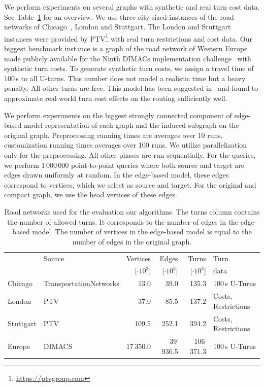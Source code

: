\documentclass[a4paper, english, cleveref]{lipics-v2021}
\begin{document}
We perform experiments on several graphs with synthetic and real turn cost data.
See Table~\ref{tab:graphs} for an overview.
We use three city-sized instances of the road networks of Chicago~\cite{TNTP}, London and Stuttgart.
The London and Stuttgart instances were provided by PTV\footnote{\url{https://ptvgroup.com}} with real turn restrictions and cost data.
Our biggest benchmark instance is a graph of the road network of Western Europe made publicly available for the Ninth DIMACs implementation challenge~\cite{DemetrescuGJ09} with synthetic turn costs.
To generate synthetic turn costs, we assign a travel time of 100\,s to all U-turns.
This number does not model a realistic time but a heavy penalty.
All other turns are free.
This model has been suggested in~\cite{DellingGPW17} and found to approximate real-world turn cost effects on the routing sufficiently well.

We perform experiments on the biggest strongly connected component of edge-based model representation of each graph and the induced subgraph on the original graph.
Preprocessing running times are averages over 10 runs, customization running times averages over 100 runs.
We utilize parallelization only for the preprocessing.
All other phases are run sequentially.
For the queries, we perform 1\,000\,000 point-to-point queries where both source and target are edges drawn uniformly at random.
In the edge-based model, these edges correspond to vertices, which we select as source and target.
For the original and compact graph, we use the head vertices of these edges.

\begin{table}
\centering
\caption{
Road networks used for the evaluation our algorithms.
The turns column contains the number of allowed turns.
It corresponds to the number of edges in the edge-based model.
The number of vertices in the edge-based model is equal to the number of edges in the original graph.
}\label{tab:graphs}
\begin{tabular}{llrrrl}
\toprule
           & Source                 &       Vertices &          Edges &          Turns & Turn           \\
           &                        & [$\cdot 10^3$] & [$\cdot 10^3$] & [$\cdot 10^3$] & data           \\
\midrule
Chicago    & TransportationNetworks &           13.0 &           39.0 &          135.3 & 100\,s U-Turns \\
London     & PTV                    &           37.0 &           85.5 &          137.2 & Costs, Restrictions \\
Stuttgart  & PTV                    &          109.5 &          252.1 &          394.2 & Costs, Restrictions \\
Europe     & DIMACS                 &      17\,350.0 &      39\,936.5 &     106\,371.3 & 100\,s U-Turns \\
\bottomrule
\end{tabular}
\end{table}
\end{document}
